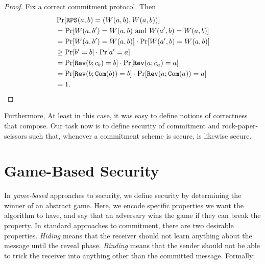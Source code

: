 \begin{proof}
	Fix a correct commitment protocol. Then \begin{align*}
		 & \Pr[{\texttt{RPS}}(a,b) = (W(a,b),W(a,b))]                                     \\
		 & = \Pr[W(a,b') = W(a,b)\text{ and }W(a',b) = W(a,b)]                       \\
		 & = \Pr[W(a,b') = W(a,b)]\cdot\Pr[W(a',b) = W(a,b)]                         \\
		 & \geq \Pr[b'=b]\cdot\Pr[a'=a]                                              \\
		 & = \Pr[{\texttt{Rev}}(b;c_b)=b]\cdot\Pr[{\texttt{Rev}}(a; c_a) = a]                  \\
		 & = \Pr[{\texttt{Rev}}(b;{\texttt{Com}}(b))=b]\cdot\Pr[{\texttt{Rev}}(a;{\texttt{Com}}(a)) = a] \\
		 & = 1.\qedhere
	\end{align*}
\end{proof}

\noindent
Furthermore,
At least in this case, it was easy to define notions of correctness that
compose. Our task now is to define security of commitment and
rock-paper-scissors such that, whenever a commitment scheme is secure,
 is likewise secure.

\section{Game-Based Security}

In \emph{game-based} approaches to security, we define security by determining
the winner of an abstract game. Here, we encode specific properties we want the
algorithm to have, and say that an adversary wins the game if they can break the
property. In standard approaches to
commitment, there are two
desirable properties. \emph{Hiding} means that the receiver should not learn
anything about the message until the reveal phase. \emph{Binding} means that the
sender should not be able to trick the receiver into anything other than the
committed message. Formally:


